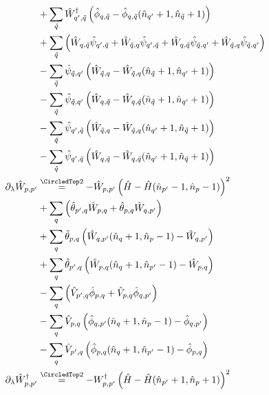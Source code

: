 \begin{appendix}
\begin{subequations}
\begin{align}
&+\Sum_{\tilde q}\hat W_{q^\prime,\tilde q}^\dagger \left(\hat\phi_{q, \tilde q}-\hat\phi_{q, \tilde q}(\hat n_{q^\prime}+1,\hat n_{\tilde q}+1)\right) \nonumber\\
&+\Sum_{\tilde q} \left(\hat W_{q,\tilde q}\hat \psi_{q^\prime,\tilde q}+\hat W_{\tilde q,q}\hat \psi_{q^\prime,\tilde q}+\hat W_{q,\tilde q}\hat \psi_{\tilde q,q^\prime}  + \hat W_{\tilde q,q}\hat \psi_{\tilde q,q^\prime}\right) \nonumber\\
&- \Sum_{\tilde q}\hat \psi_{\tilde q,q^\prime} \left(\hat W_{ \tilde q,q}-\hat W_{ \tilde q,q}(\hat n_{\tilde q}+1,\hat n_{q^\prime}+1)\right)\nonumber\\
&-\Sum_{\tilde q}\hat \psi_{\tilde q,q^\prime} \left(\hat W_{q,\tilde q}-\hat W_{q,\tilde q}(\hat n_{\tilde q}+1,\hat n_{q^\prime}+1)\right) \nonumber\\
&-\Sum_{\tilde q}\hat \psi_{q^\prime,\tilde q} \left(\hat W_{\tilde q,q}-\hat W_{\tilde q,q}(\hat n_{q^\prime}+1,\hat n_{\tilde q}+1)\right) \nonumber\\
&-\Sum_{\tilde q}\hat \psi_{q^\prime,\tilde q} \left(\hat W_{q, \tilde q}-\hat W_{q, \tilde q}(\hat n_{q^\prime}+1,\hat n_{\tilde q}+1)\right) \nonumber\\
\partial_\lambda\hat W_{p,p^\prime}&\eqsec -\hat W_{p,p^\prime}\left(\hat H-\hat H(\hat n_{p^\prime}-1,\hat n_p -1)\right)^2\\
&+\Sum_{q}\left(\hat\theta_{ p^\prime, q}\hat W_{p,q}+\hat\theta_{ p,q}\hat W_{q,p^\prime}\right) \nonumber\\
&+  \Sum_{ q} \hat\theta_{ p,q}\left(\hat W_{q,p^\prime}(\hat n_{q}+1,\hat n_p-1)- \hat W_{q,p^\prime}\right)                         \nonumber\\
&+        \Sum_{ q} \hat\theta_{ p^\prime,q}\left(\hat W_{p,q}(\hat n_{q}+1,\hat n_{p^\prime}-1)- \hat W_{p,q}\right)                   \nonumber\\
&-       \Sum_{q}\left(\hat V_{ p^\prime, q}\hat \phi_{p,q}+\hat V_{ p,q}\hat \phi_{q,p^\prime}\right)                    \nonumber\\
&-         \Sum_{ q} \hat V_{ p,q}\left(\hat \phi_{q,p^\prime}(\hat n_{q}+1,\hat n_p-1)- \hat \phi_{q,p^\prime}\right)                  \nonumber\\
&-          \Sum_{ q} \hat V_{ p^\prime,q}\left(\hat \phi_{p,q}(\hat n_{q}+1,\hat n_{p^\prime}-1)- \hat \phi_{p,q}\right)                 \nonumber\\
\partial_\lambda\hat W_{p,p^\prime}^\dagger&\eqsec -W_{p,p^\prime}^\dagger\left(\hat H-\hat H(\hat n_{p^\prime}+1,\hat n_p +1)\right)^2\\

\end{align}
\end{subequations}
\end{appendix}
